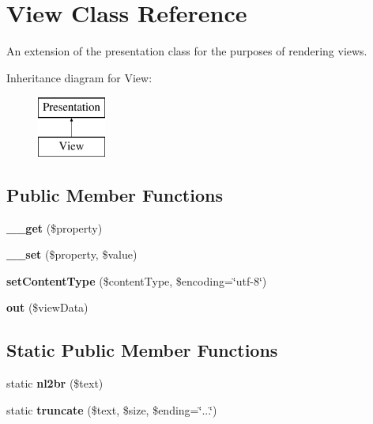 \hypertarget{class_view}{
\section{View Class Reference}
\label{class_view}
}


An extension of the presentation class for the purposes of rendering views.  


Inheritance diagram for View:\begin{figure}[H]
\begin{center}
\leavevmode
\includegraphics[height=2.000000cm]{class_view}
\end{center}
\end{figure}
\subsection*{Public Member Functions}
\begin{DoxyCompactItemize}
\item 
\hypertarget{class_view_a1a20d5b903df27a7fabd35d5ba2c948b}{
{\bfseries \_\-\_\-get} (\$property)}
\label{class_view_a1a20d5b903df27a7fabd35d5ba2c948b}

\item 
\hypertarget{class_view_a33d0faa66868e5135b2fbbb3d5bdedb9}{
{\bfseries \_\-\_\-set} (\$property, \$value)}
\label{class_view_a33d0faa66868e5135b2fbbb3d5bdedb9}

\item 
\hypertarget{class_view_a91878a0c91339935a1611de30b9939da}{
{\bfseries setContentType} (\$contentType, \$encoding=\char`\"{}utf-\/8\char`\"{})}
\label{class_view_a91878a0c91339935a1611de30b9939da}

\item 
\hypertarget{class_view_a72804c91ac361178a72f13311852a8dd}{
{\bfseries out} (\$viewData)}
\label{class_view_a72804c91ac361178a72f13311852a8dd}

\end{DoxyCompactItemize}
\subsection*{Static Public Member Functions}
\begin{DoxyCompactItemize}
\item 
\hypertarget{class_view_ad9901cc61f7e80e3f8735e3644723861}{
static {\bfseries nl2br} (\$text)}
\label{class_view_ad9901cc61f7e80e3f8735e3644723861}

\item 
\hypertarget{class_view_afc617903f72de43dca2003aec1742132}{
static {\bfseries truncate} (\$text, \$size, \$ending=\char`\"{}...\char`\"{})}
\label{class_view_afc617903f72de43dca2003aec1742132}

\end{DoxyCompactItemize}
